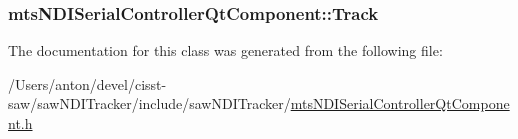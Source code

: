\subsubsection[{Track}]{ mts\+N\+D\+I\+Serial\+Controller\+Qt\+Component\+::\+Track}\label{classmts_n_d_i_serial_controller_qt_component_a66900ce8b560e20acd6b8676b8d2273b}


The documentation for this class was generated from the following file\+:\begin{DoxyCompactItemize}
\item 
/\+Users/anton/devel/cisst-\/saw/saw\+N\+D\+I\+Tracker/include/saw\+N\+D\+I\+Tracker/\hyperlink{mts_n_d_i_serial_controller_qt_component_8h}{mts\+N\+D\+I\+Serial\+Controller\+Qt\+Component.\+h}\end{DoxyCompactItemize}
